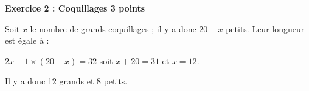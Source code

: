 \textbf{Exercice 2 : Coquillages \hfill 3 points}

\bigskip

% 
%
% 
Soit $x$ le nombre de grands coquillages ; il y a donc $20 - x$ petits. Leur longueur est égale à :

$2x + 1\times (20 - x) = 32$ soit $x + 20 = 31$ et $x = 12$.

Il y a donc 12 grands et 8 petits.
\bigskip 

